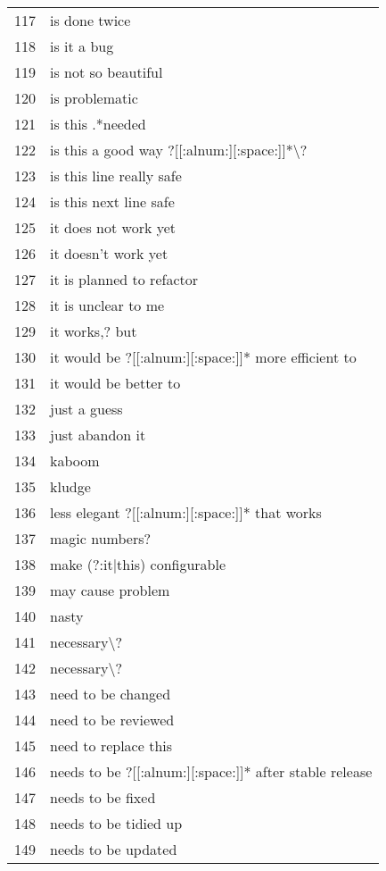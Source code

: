\begin{longtable}{r|l}
117 & is done twice\\
118 & is it a bug\\
119 & is not so beautiful\\
120 & is problematic\\
121 & is this .*needed\\
122 & is this a good way ?[[:alnum:][:space:]]*\textbackslash{}?\\
123 & is this line really safe\\
124 & is this next line safe\\
125 & it does not work yet\\
126 & it doesn't work yet\\
127 & it is planned to refactor\\
128 & it is unclear to me\\
129 & it works,? but\\
130 & it would be ?[[:alnum:][:space:]]* more efficient to\\
131 & it would be better to\\
132 & just a guess\\
133 & just abandon it\\
134 & kaboom\\
135 & kludge\\
136 & less elegant ?[[:alnum:][:space:]]* that works\\
137 & magic numbers?\\
138 & make (?:it|this) configurable\\
139 & may cause problem\\
140 & nasty\\
141 & necessary\textbackslash{}?\\
142 & necessary\textbackslash{}?\\
143 & need to be changed\\
144 & need to be reviewed\\
145 & need to replace this\\
146 & needs to be ?[[:alnum:][:space:]]* after stable release\\
147 & needs to be fixed\\
148 & needs to be tidied up\\
149 & needs to be updated\\

\end{longtable}
